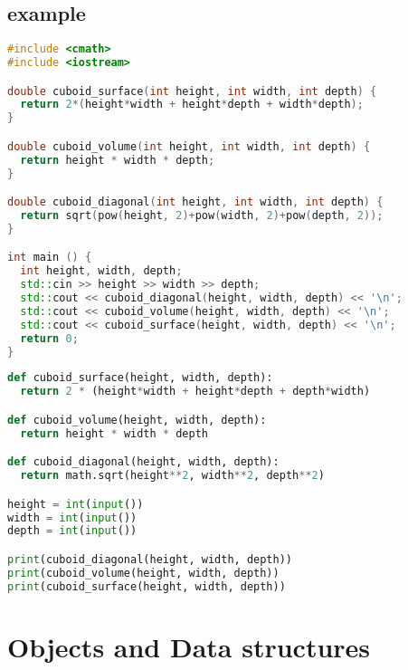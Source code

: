\documentclass{beamer}
\begin{document}
\subsection{example}
\begin{frame}[fragile]
  \begin{lstlisting}[language=C++]
#include <cmath>
#include <iostream>

double cuboid_surface(int height, int width, int depth) {
  return 2*(height*width + height*depth + width*depth);
}

double cuboid_volume(int height, int width, int depth) {
  return height * width * depth;
}

double cuboid_diagonal(int height, int width, int depth) {
  return sqrt(pow(height, 2)+pow(width, 2)+pow(depth, 2));
}

int main () {
  int height, width, depth;
  std::cin >> height >> width >> depth;
  std::cout << cuboid_diagonal(height, width, depth) << '\n';
  std::cout << cuboid_volume(height, width, depth) << '\n';
  std::cout << cuboid_surface(height, width, depth) << '\n';
  return 0;
} \end{lstlisting}

\end{frame}
\begin{frame}[fragile]
  \begin{lstlisting}[language=Python]
def cuboid_surface(height, width, depth):
  return 2 * (height*width + height*depth + depth*width)

def cuboid_volume(height, width, depth):
  return height * width * depth

def cuboid_diagonal(height, width, depth):
  return math.sqrt(height**2, width**2, depth**2)

height = int(input())
width = int(input())
depth = int(input())

print(cuboid_diagonal(height, width, depth))
print(cuboid_volume(height, width, depth))
print(cuboid_surface(height, width, depth))\end{lstlisting}

\end{frame}

\section{Objects and Data structures}
\end{document}
